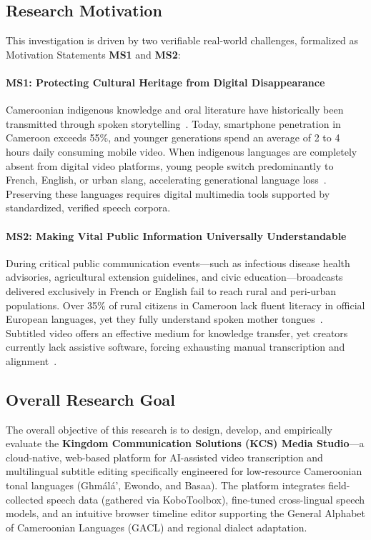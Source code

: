 \documentclass[conference]{IEEEtran}
\begin{document}
\subsection{Research Motivation}
\label{sec:intro:motivation}

This investigation is driven by two verifiable real-world challenges, formalized as Motivation Statements \textbf{MS1} and \textbf{MS2}:

\paragraph{\textbf{MS1: Protecting Cultural Heritage from Digital Disappearance}}
Cameroonian indigenous knowledge and oral literature have historically been transmitted through spoken storytelling~\cite{carroll2020care}. Today, smartphone penetration in Cameroon exceeds 55\%, and younger generations spend an average of 2 to 4 hours daily consuming mobile video. When indigenous languages are completely absent from digital video platforms, young people switch predominantly to French, English, or urban slang, accelerating generational language loss~\cite{carroll2020care, nekoto2020participatory}. Preserving these languages requires digital multimedia tools supported by standardized, verified speech corpora.

\paragraph{\textbf{MS2: Making Vital Public Information Universally Understandable}}
During critical public communication events---such as infectious disease health advisories, agricultural extension guidelines, and civic education---broadcasts delivered exclusively in French or English fail to reach rural and peri-urban populations. Over 35\% of rural citizens in Cameroon lack fluent literacy in official European languages, yet they fully understand spoken mother tongues~\cite{norman1986user, w3c2019webvtt}. Subtitled video offers an effective medium for knowledge transfer, yet creators currently lack assistive software, forcing exhausting manual transcription and alignment~\cite{w3c2019webvtt}.

\subsection{Overall Research Goal}
\label{sec:intro:goal}

The overall objective of this research is to design, develop, and empirically evaluate the \textbf{Kingdom Communication Solutions (KCS) Media Studio}---a cloud-native, web-based platform for AI-assisted video transcription and multilingual subtitle editing specifically engineered for low-resource Cameroonian tonal languages (Gh\textopeno m\'al\'a', Ewondo, and Basaa). The platform integrates field-collected speech data (gathered via KoboToolbox), fine-tuned cross-lingual speech models, and an intuitive browser timeline editor supporting the General Alphabet of Cameroonian Languages (GACL) and regional dialect adaptation.
\end{document}
